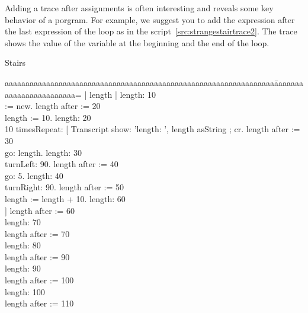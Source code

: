 Adding a trace after assignments is often interesting and reveals some key behavior of a porgram. For example, we suggest you to add the expression  after the last expression of the loop as in the script~\ref{src:strangestairtrace2}. The trace shows the value of the variable  at the beginning and the end of the loop. 

\begin{scriptwithtitle}{Stairs}\label{src:strangestairtrace2}
\begin{tabbing}
aaaaaaaaaaaaaaaaaaaaaaaaaaaaaaaaaaaaaaaaaaaaaaaaaaaaaaaaaaaaaaaaa\=aaaaaaaaaaaaaaaaaaaaaaaa=\kill
| \caro length | \> length: 10\\
\caro := \Turtle new.\> length after := 20\\
length := 10.\> length: 20 \\
10 timesRepeat: [ Transcript show: 'length: ',  length asString ; cr. \> length after := 30\\
                \caro go: length. \> length: 30 \\
                \caro turnLeft: 90. \> length after := 40\\
                \caro go: 5. \> length: 40\\
                \caro turnRight: 90. \> length after := 50\\
                length := length + 10. \> length: 60 \\
                 ] \> length after := 60\\
                \> length: 70\\
                \> length after := 70 \\
                \> length: 80\\
                \> length after := 90\\
                \> length: 90\\
                \> length after := 100\\
                \> length: 100\\
                \> length after := 110
\end{tabbing}
\end{scriptwithtitle}


\summa



